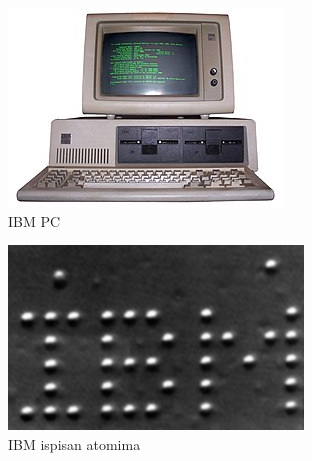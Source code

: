 \documentclass{beamer}
\begin{document}
\begin{frame}[fragile]
\begin{figure}[htb]
\medskip
\begin{subfigure}{0.25\textwidth}
  \includegraphics[width=\linewidth]{ibmpc.jpg}
  \caption{IBM PC}
  \label{fig:4}
\end{subfigure}\hfil 
\begin{subfigure}{0.25\textwidth}
  \includegraphics[width=\linewidth]{ibm_atom.png}
  \caption{IBM ispisan atomima}
  \label{fig:5}
\end{subfigure}\hfil 
\begin{subfigure}{0.25\textwidth}

\end{subfigure}
\end{figure}
\end{frame}
\end{document}
